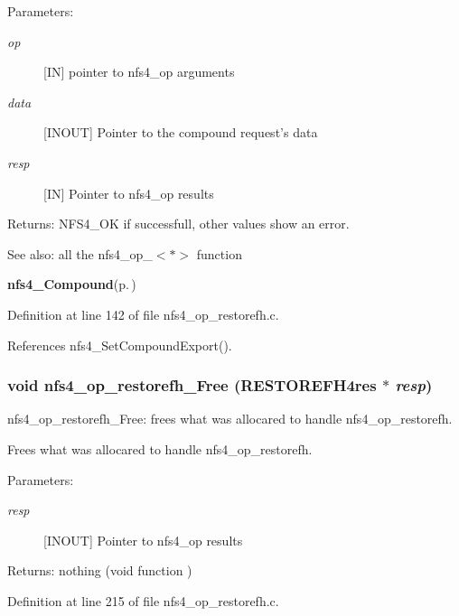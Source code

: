 \begin{Desc}
\item[Parameters:]
\begin{description}
\item[{\em op}][IN] pointer to nfs4\_\-op arguments \item[{\em data}][INOUT] Pointer to the compound request's data \item[{\em resp}][IN] Pointer to nfs4\_\-op results\end{description}
\end{Desc}
\begin{Desc}
\item[Returns:]NFS4\_\-OK if successfull, other values show an error.\end{Desc}
\begin{Desc}
\item[See also:]all the nfs4\_\-op\_\-$<$$\ast$$>$ function 

{\bf nfs4\_\-Compound}{\rm (p.\,\pageref{nfs4__Compound_8c_a4})} \end{Desc}


Definition at line 142 of file nfs4\_\-op\_\-restorefh.c.

References nfs4\_\-Set\-Compound\-Export().
\subsubsection{\setlength{\rightskip}{0pt plus 5cm}void nfs4\_\-op\_\-restorefh\_\-Free (RESTOREFH4res $\ast$ {\em resp})}\label{nfs4__op__restorefh_8c_a1}


nfs4\_\-op\_\-restorefh\_\-Free: frees what was allocared to handle nfs4\_\-op\_\-restorefh.

Frees what was allocared to handle nfs4\_\-op\_\-restorefh.

\begin{Desc}
\item[Parameters:]
\begin{description}
\item[{\em resp}][INOUT] Pointer to nfs4\_\-op results\end{description}
\end{Desc}
\begin{Desc}
\item[Returns:]nothing (void function ) \end{Desc}


Definition at line 215 of file nfs4\_\-op\_\-restorefh.c.